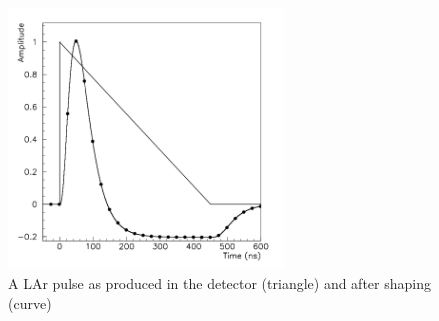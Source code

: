 \begin{figure}
        \centering
	\includegraphics[width=0.65\textwidth]{figures/ch3/lar_pulse.png}
	\caption{A LAr pulse as produced in the detector (triangle) and after shaping (curve) \cite{lar_tdr}}
	\label{fig:lar_pulse}
\end{figure}